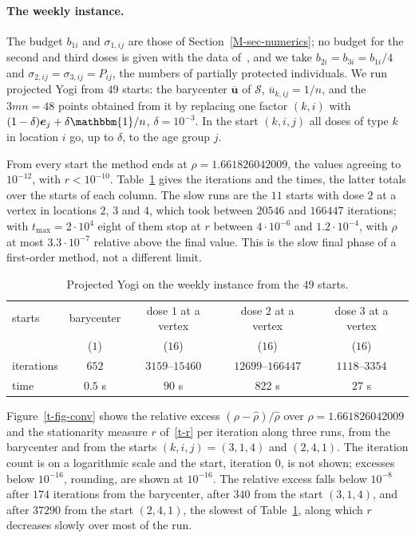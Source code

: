 \documentclass[11pt]{article}
\theoremstyle{plain}
\theoremstyle{remark}
\numberwithin{equation}{section}
\begin{document}
\paragraph{The weekly instance.} The budget $b_{1i}$ and $\sigma_{1,ij}$ are
those of Section~\ref{M-sec-numerics}; no budget for the second and third doses
is given with the data of~\cite{JZh}, and we take $b_{2i}=b_{3i}=b_{1i}/4$ and
$\sigma_{2,ij}=\sigma_{3,ij}=P_{ij}$, the numbers of partially protected
individuals. We run projected Yogi from $49$ starts: the
barycenter $\overline{\bm u}$ of $\mathcal{S}$, $\overline u_{k,ij}=1/n$, and
the $3mn=48$ points obtained from it by replacing one factor $(k,i)$ with
$(1-\delta)\bm e_j+\delta\mathbbm{1}/n$, $\delta=10^{-3}$. In the start
$(k,i,j)$ all doses of type $k$ in location $i$ go, up to $\delta$, to the age
group $j$.

From every start the method ends at $\rho=1.661826042009$, the values agreeing
to $10^{-12}$, with $r<10^{-10}$. Table~\ref{t-tab-yogi} gives the iterations
and the times, the latter totals over the starts of each column. The slow runs are the $11$ starts with dose $2$ at a vertex in
locations $2$, $3$ and $4$, which took between $20546$ and $166447$
iterations; with $t_{\max}=2\cdot 10^4$ eight of them stop at $r$ between
$4\cdot 10^{-6}$ and $1.2\cdot 10^{-4}$, with $\rho$ at most
$3.3\cdot 10^{-7}$ relative above the final value. This is the slow final
phase of a first-order method, not a different limit.

\begin{table}[ht]
\centering
\small
\begin{tabular}{lcccc}
\hline
starts & barycenter & dose $1$ at a vertex & dose $2$ at a vertex & dose $3$ at a vertex\\
 & ($1$) & ($16$) & ($16$) & ($16$)\\
\hline
iterations & $652$ & $3159$--$15460$ & $12699$--$166447$ & $1118$--$3354$\\
time & $0.5$ s & $90$ s & $822$ s & $27$ s\\
\hline
\end{tabular}
\caption{Projected Yogi on the weekly instance from the $49$ starts.}\label{t-tab-yogi}
\end{table}

Figure~\ref{t-fig-conv} shows the relative excess $(\rho-\widehat\rho)/\widehat\rho$ over
$\widehat\rho=1.661826042009$ and the stationarity measure $r$ of~\eqref{t-r} per
iteration along three runs, from the barycenter and from the starts
$(k,i,j)=(3,1,4)$ and $(2,4,1)$. The iteration count is on a logarithmic
scale and the start, iteration $0$, is not shown; excesses below $10^{-16}$,
rounding, are shown at $10^{-16}$. The relative excess falls below $10^{-8}$ after $174$ iterations from the
barycenter, after $340$ from the start $(3,1,4)$, and after $37290$ from the
start $(2,4,1)$, the slowest of Table~\ref{t-tab-yogi}, along which $r$
decreases slowly over most of the run.
\end{document}
